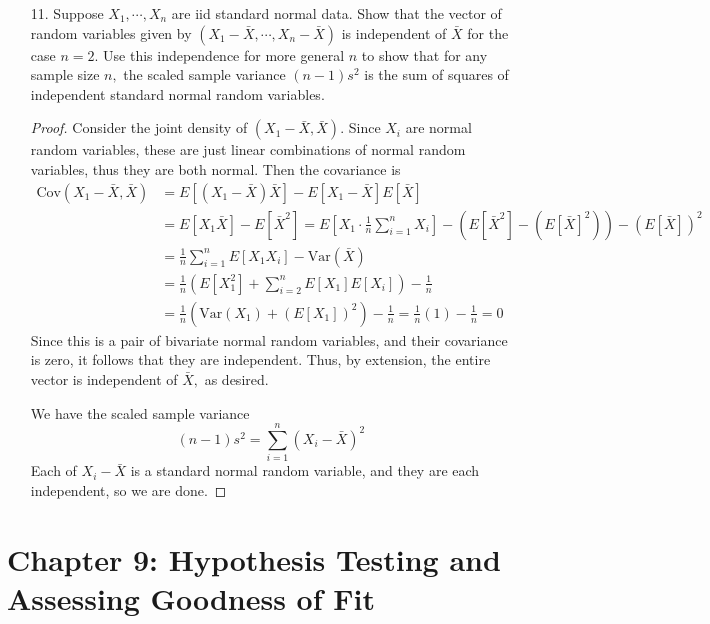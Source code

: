 \documentclass{article}
\newcommand{\var}{\mathrm{Var}}
\newcommand{\cov}{\mathrm{Cov}}
\begin{document}
\begin{enumerate}
	\item[11.] Suppose $X_1, \cdots, X_n$ are iid standard normal data. Show that the vector of random variables given by $(X_1-\bar{X}, \cdots, X_n-\bar{X})$ is independent of $\bar{X}$ for the case $n=2.$ Use this independence for more general $n$ to show that for any sample size $n,$ the scaled sample variance $(n-1)s^2$ is the sum of squares of independent standard normal random variables.
		\begin{proof}
			Consider the joint density of $(X_1-\bar{X}, \bar{X}).$ Since $X_i$ are normal random variables, these are just linear combinations of normal random variables, thus they are both normal. Then the covariance is 
			\begin{align*}
				\cov(X_1-\bar{X}, \bar{X}) &= E[(X_1-\bar{X})\bar{X}] - E[X_1-\bar{X}]E[\bar{X}] \\
				&= E[X_1 \bar{X}] - E[\bar{X}^2] = E\left[ X_1 \cdot \frac{1}{n} \sum_{i=1}^{n} X_i \right] - \left(E[\bar{X}^2]-(E[\bar{X}]^2) \right)- (E[\bar{X}])^2  \\
				&= \frac{1}{n} \sum_{i=1}^{n} E[X_1 X_i] - \var(\bar{X}) \\
				&= \frac{1}{n} \left( E[X_1^2] + \sum_{i=2}^{n}E[X_1]E[X_i] \right)-\frac{1}{n} \\
				&= \frac{1}{n} \left( \var(X_1) + (E[X_1])^2 \right) - \frac{1}{n} = \frac{1}{n} \left( 1 \right)-\frac{1}{n} = 0
			\end{align*}
			Since this is a pair of bivariate normal random variables, and their covariance is zero, it follows that they are independent. Thus, by extension, the entire vector is independent of $\bar{X},$ as desired.

			We have the scaled sample variance \[(n-1)s^2 = \sum_{i=1}^{n} (X_i-\bar{X})^2\] Each of $X_i-\bar{X}$ is a standard normal random variable, and they are each independent, so we are done.

		\end{proof}

\end{enumerate}

\section*{Chapter 9: Hypothesis Testing and Assessing Goodness of Fit}
\end{document}
